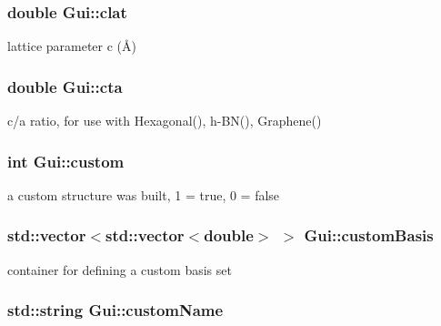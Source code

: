 \subsubsection[{clat}]{\setlength{\rightskip}{0pt plus 5cm}double Gui\+::clat}\label{class_gui_ac92e0603324d6b978d1813d0d0c2bef9}


lattice parameter c (Å) 

\hypertarget{class_gui_a105eb1ab34dee685c11005e47c44ee16}{}
\subsubsection[{cta}]{\setlength{\rightskip}{0pt plus 5cm}double Gui\+::cta}\label{class_gui_a105eb1ab34dee685c11005e47c44ee16}


c/a ratio, for use with Hexagonal(), h-\/\+B\+N(), Graphene() 

\hypertarget{class_gui_aedb074749fe28d1c9b11b5200017b1a7}{}
\subsubsection[{custom}]{\setlength{\rightskip}{0pt plus 5cm}int Gui\+::custom}\label{class_gui_aedb074749fe28d1c9b11b5200017b1a7}


a custom structure was built, 1 = true, 0 = false 

\hypertarget{class_gui_a0ba23b6cdb6a13e279ebb07098e265b5}{}
\subsubsection[{custom\+Basis}]{\setlength{\rightskip}{0pt plus 5cm}std\+::vector$<$std\+::vector$<$double$>$ $>$ Gui\+::custom\+Basis}\label{class_gui_a0ba23b6cdb6a13e279ebb07098e265b5}


container for defining a custom basis set 

\hypertarget{class_gui_a062cae171eaf8234689de5fe473692e3}{}
\subsubsection[{custom\+Name}]{\setlength{\rightskip}{0pt plus 5cm}std\+::string Gui\+::custom\+Name}\label{class_gui_a062cae171eaf8234689de5fe473692e3}


